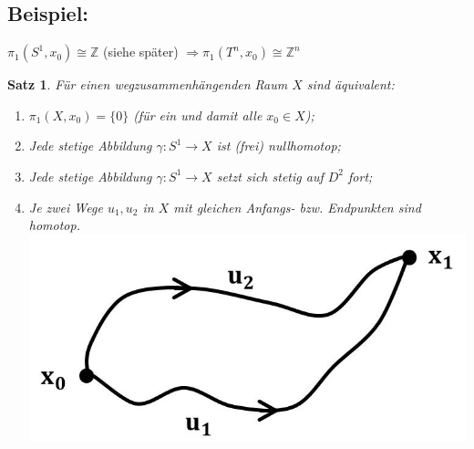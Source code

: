 \documentclass[a4paper,11pt,notitlepage]{report}
\newtheorem{theorem}{Satz}[chapter]
\newcommand{\Z}{{\ensuremath{\mathbb{Z}}}}
\newenvironment{bsp}[1]
{
\setlength{\fboxsep}{10pt}
\subsection*{Beispiel: #1}
\begin{upshape}
}
{
\end{upshape}
}
\begin{document}
\begin{bsp}{}
	$\pi_1(S^1,x_0) \cong \Z$ (siehe später) \newline
	$\Rightarrow \pi_1(T^n, x_0) \cong \Z^n$
\end{bsp}

\begin{theorem}
	Für einen wegzusammenhängenden Raum $X$ sind äquivalent:
	\begin{enumerate}
		\item $\pi_1(X,x_0) = \{0\}$ (für ein und damit alle $x_0 \in X$);
		\item Jede stetige Abbildung $\gamma \colon S^1 \rightarrow X$ ist (frei) nullhomotop;
		\item Jede stetige Abbildung $\gamma \colon S^1 \rightarrow X$ setzt sich stetig auf $D^2$ fort; %
		\item Je zwei Wege $u_1, u_2$ in $X$ mit gleichen Anfangs- bzw. Endpunkten sind homotop. \newline
		\includegraphics[scale=0.4]{images/Wege_homotop.jpg}
	\end{enumerate}
\end{theorem}
\end{document}
